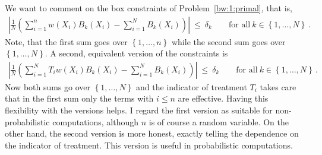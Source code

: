 \begin{remark}
  We want to comment on the box constraints of Problem~\ref{bw:1:primal}, that is,
 \begin{gather*}
      \left| 
      \frac{1}{N} 
      \left( 
      \sum_{i = 1}^{n} 
      w(X_i)
      B_k(X_i)
      -
      \sum_{i=1}^{N} 
      B_k(X_i)
      \right)
    \right|
    \ 
    \le 
    \ 
    \delta_k
    \qquad
    \text{for all}\ 
    k \in \left\{ 1, \ldots, N \right\}
    \,.
  \end{gather*}
  Note, that the first sum goes over $\left\{ 1,\ldots,n \right\}$ while the second sum goes over $\left\{ 1,\ldots,N \right\}$.
  A second, equivalent version of the constraints is
  \begin{gather*}
      \left| 
      \frac{1}{N} 
      \left( 
      \sum_{i = 1}^{N} 
      T_i
      w(X_i)
      B_k(X_i)
      -
      \sum_{i=1}^{N} 
      B_k(X_i)
      \right)
    \right|
    \ 
    \le 
    \ 
    \delta_k
    \qquad
    \text{for all}\ 
    k \in \left\{ 1, \ldots, N \right\}
    \,.
  \end{gather*}
  Now both sums go over $\left\{ 1,\ldots,N \right\}$ and the
  indicator of treatment $T_i$ takes care that in the first sum only the terms with $i\le n$ are effective. 
  Having this flexibility with the versions helps. I regard the first version as suitable for non-probabilistic computations, although $n$ is of course a random variable. On the other hand, the second version is more honest, exactly telling the dependence on the indicator of treatment. This version is useful in probabilistic computations. 


\end{remark}
